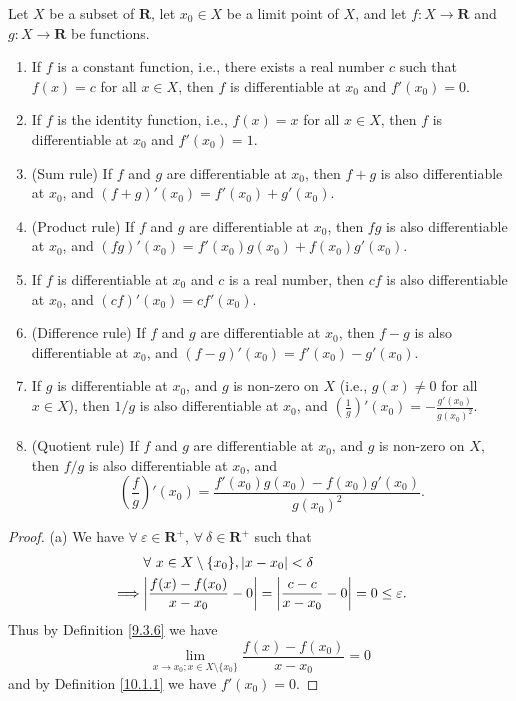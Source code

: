 \begin{theorem}\label{10.1.13}
    Let \(X\) be a subset of \(\mathbf{R}\), let \(x_0 \in X\) be a limit point of \(X\), and let \(f : X \to \mathbf{R}\) and \(g : X \to \mathbf{R}\) be functions.
    \begin{enumerate}
        \item If \(f\) is a constant function, i.e., there exists a real number \(c\) such that \(f(x) = c\) for all \(x \in X\), then \(f\) is differentiable at \(x_0\) and \(f'(x_0) = 0\).
        \item If \(f\) is the identity function, i.e., \(f(x) = x\) for all \(x \in X\), then \(f\) is differentiable at \(x_0\) and \(f'(x_0) = 1\).
        \item (Sum rule)
              If \(f\) and \(g\) are differentiable at \(x_0\), then \(f + g\) is also differentiable at \(x_0\), and \((f + g)'(x_0) = f'(x_0) + g'(x_0)\).
        \item (Product rule)
              If \(f\) and \(g\) are differentiable at \(x_0\), then \(fg\) is also differentiable at \(x_0\), and \((fg)'(x_0) = f'(x_0)g(x_0) + f(x_0)g'(x_0)\).
        \item If \(f\) is differentiable at \(x_0\) and \(c\) is a real number, then \(cf\) is also differentiable at \(x_0\), and \((cf)'(x_0) = cf'(x_0)\).
        \item (Difference rule)
              If \(f\) and \(g\) are differentiable at \(x_0\), then \(f - g\) is also differentiable at \(x_0\), and \((f - g)'(x_0) = f'(x_0) - g'(x_0)\).
        \item If \(g\) is differentiable at \(x_0\), and \(g\) is non-zero on \(X\) (i.e., \(g(x) \neq 0\) for all \(x \in X\)), then \(1 / g\) is also differentiable at \(x_0\), and \((\frac{1}{g})'(x_0) = -\frac{g'(x_0)}{g(x_0)^2}\).
        \item (Quotient rule)
              If \(f\) and \(g\) are differentiable at \(x_0\), and \(g\) is non-zero on \(X\), then \(f / g\) is also differentiable at \(x_0\), and
              \[
                  (\frac{f}{g})'(x_0) = \frac{f'(x_0) g(x_0) - f(x_0) g'(x_0)}{g(x_0)^2}.
              \]
    \end{enumerate}
\end{theorem}

\begin{proof}{(a)}
    We have \(\forall\ \varepsilon \in \mathbf{R}^+\), \(\forall\ \delta \in \mathbf{R}^+\) such that
    \begin{align*}
                 & \forall\ x \in X \setminus \{x_0\}, \abs*{x - x_0} < \delta                                       \\
        \implies & \abs*{\frac{f(x) - f(x_0)}{x - x_0} - 0} = \abs*{\frac{c - c}{x - x_0} - 0} = 0 \leq \varepsilon.
    \end{align*}
    Thus by Definition \ref{9.3.6} we have
    \[
        \lim_{x \to x_0 ; x \in X \setminus \{x_0\}} \frac{f(x) - f(x_0)}{x - x_0} = 0
    \]
    and by Definition \ref{10.1.1} we have \(f'(x_0) = 0\).
\end{proof}

